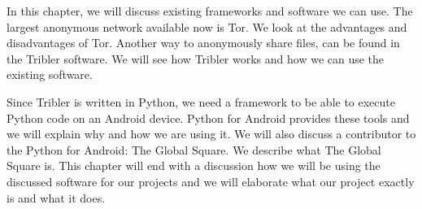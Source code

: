 
In this chapter, we will discuss existing frameworks and software we can use. The largest anonymous network available now is Tor. We look at the advantages and disadvantages of Tor. Another way to anonymously share files, can be found in the Tribler software. We will see how Tribler works and how we can use the existing software.
	
Since Tribler is written in Python, we need a framework to be able to execute Python code on an Android device. Python for Android provides these tools and we will explain why and how we are using it. We will also discuss a contributor to the Python for Android: The Global Square. We describe what The Global Square is. This chapter will end with a discussion how we will be using the discussed software for our projects and we will elaborate what our project exactly is and what it does.
